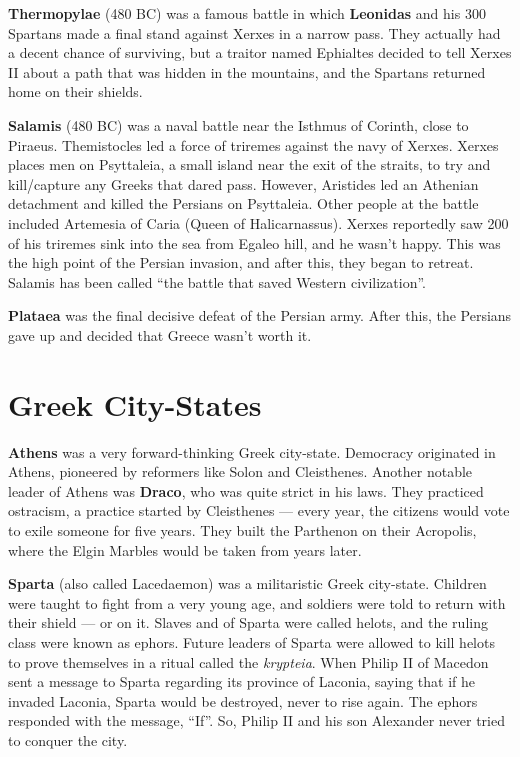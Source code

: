 \textbf{Thermopylae} (480 BC) was a famous battle in which \textbf{Leonidas} and his 300 Spartans
made a final stand against Xerxes in a narrow pass.
They actually had a decent chance of surviving,
but a traitor named Ephialtes decided to tell Xerxes II about a path that
was hidden in the mountains, and the Spartans returned home on their shields.

\textbf{Salamis} (480 BC) was a naval battle near the Isthmus of Corinth, close to Piraeus.
Themistocles led a force of triremes against the navy of Xerxes.
Xerxes places men on Psyttaleia, a small island near the exit of the straits,
to try and kill/capture any Greeks that dared pass.
However, Aristides led an Athenian detachment and killed the Persians on Psyttaleia.
Other people at the battle included Artemesia of Caria (Queen of Halicarnassus).
Xerxes reportedly saw 200 of his triremes sink into the sea from Egaleo hill, and he wasn't happy.
This was the high point of the Persian invasion, and after this, they began to retreat.
Salamis has been called ``the battle that saved Western civilization''.

\textbf{Plataea} was the final decisive defeat of the Persian army.
After this, the Persians gave up and decided that Greece wasn't worth it.

\section{Greek City-States}

\textbf{Athens} was a very forward-thinking Greek city-state.
Democracy originated in Athens, pioneered by reformers like Solon and Cleisthenes.
Another notable leader of Athens was \textbf{Draco}, who was quite strict in his laws.
They practiced ostracism, a practice started by Cleisthenes ---
every year, the citizens would vote to exile someone for five years.
They built the Parthenon on their Acropolis, where the Elgin Marbles would be taken from years later.

\textbf{Sparta} (also called Lacedaemon) was a militaristic Greek city-state.
Children were taught to fight from a very young age, and soldiers were told to return with their shield --- or on it.
Slaves and of Sparta were called helots, and the ruling class were known as ephors.
Future leaders of Sparta were allowed to kill helots to prove themselves in a ritual called the \textit{krypteia}.
When Philip II of Macedon sent a message to Sparta regarding its province of Laconia,
saying that if he invaded Laconia, Sparta would be destroyed, never to rise again.
The ephors responded with the message, ``If''.
So, Philip II and his son Alexander never tried to conquer the city.

